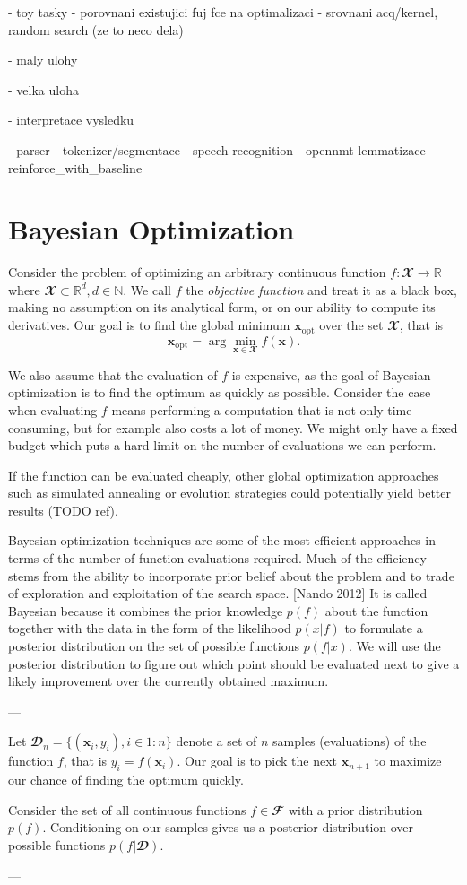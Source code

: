 - toy tasky
  - porovnani existujici fuj fce na optimalizaci
  - srovnani acq/kernel, random search (ze to neco dela)

- maly ulohy

- velka uloha

- interpretace vysledku



- parser
- tokenizer/segmentace
- speech recognition
- opennmt lemmatizace
- reinforce_with_baseline





\section{Bayesian Optimization}

Consider the problem of optimizing an arbitrary continuous function $f: 𝓧 → ℝ$
where $𝓧 ⊂ ℝ^d, d ∈ ℕ$. We call $f$ the \emph{objective function} and treat it
as a black box, making no assumption on its analytical form, or on our ability
to compute its derivatives. Our goal is to find the global minimum
$\symbf{x}_\text{opt}$ over the set $𝓧$, that is
$$
\symbf{x}_\text{opt} = \arg\min_{\symbf{x} ∈ 𝓧} f(\symbf{x}).
$$

We also assume that the evaluation of $f$ is expensive, as the goal of Bayesian
optimization is to find the optimum as quickly as possible.  Consider the case
when evaluating $f$ means performing a computation that is not only time
consuming, but for example also costs a lot of money. We might only have a
fixed budget which puts a hard limit on the number of evaluations we can
perform.

If the function can be evaluated cheaply, other global optimization approaches
such as simulated annealing or evolution strategies could potentially yield
better results (TODO ref).


Bayesian optimization techniques are some of the most efficient approaches in
terms of the number of function evaluations required. Much of the efficiency
stems from the ability to incorporate prior belief about the problem and to
trade of exploration and exploitation of the search space. [Nando 2012] It is
called Bayesian because it combines the prior knowledge $p(f)$ about the
function together with the data in the form of the likelihood $p(x|f)$ to
formulate a posterior distribution on the set of possible functions $p(f|x)$.
We will use the posterior distribution to figure out which point should be
evaluated next to give a likely improvement over the currently obtained
maximum.

---

Let $𝓓_n = \{ (\symbf{x}_i, y_i), i \in 1:n\}$ denote a set of $n$ samples
(evaluations) of the function $f$, that is $y_i = f(\symbf{x}_i)$. Our goal is
to pick the next $\symbf{x}_{n+1}$ to maximize our chance of finding the
optimum quickly.

Consider the set of all continuous functions $f ∈ 𝓕$ with a prior distribution
$p(f)$.  Conditioning on our samples gives us a posterior distribution over
possible functions $p(f | 𝓓)$.

---

